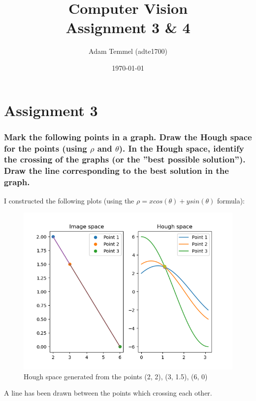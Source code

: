 \documentclass[a4paper, titlepage,12pt]{article}
\title{Computer Vision\\Assignment 3 \& 4}
\author{Adam Temmel (adte1700)}
\date{\today}
\begin{document}
\maketitle

\section*{Assignment 3}
	\subsubsection*{Mark the following points in a graph. Draw the Hough space for the points (using $\rho$ and $\theta$). In the Hough space, identify the crossing of the graphs (or the ”best possible solution”). Draw the line corresponding to the best solution in the graph.}

	I constructed the following plots (using the $\rho = x cos(\theta) + y sin(\theta)$ formula):

	\begin{figure}[h!]
		\begin{center}
		\includegraphics[scale=0.8]{./pts_1.png}
			\caption{Hough space generated from the points (2, 2), (3, 1.5), (6, 0)}
		\end{center}
	\end{figure}

	A line has been drawn between the points which crossing each other.
	\newpage
\end{document}
